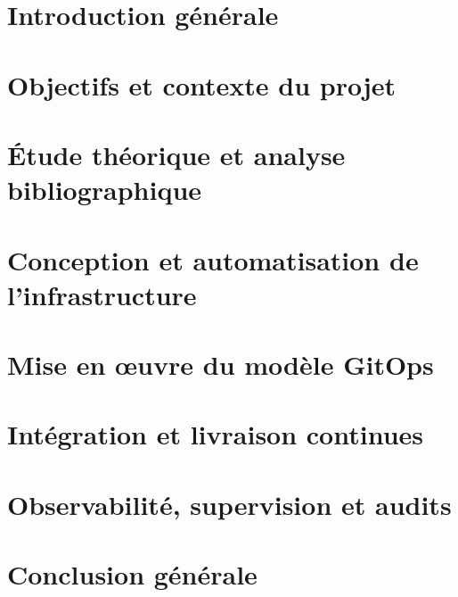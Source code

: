 \chapter{Introduction générale}


\chapter{Objectifs et contexte du projet}\label{chapter:objectifs_contexte}


\chapter{Étude théorique et analyse bibliographique}\label{chapter:etude_theorique}


\chapter{Conception et automatisation de l’infrastructure}\label{chapter:iac}


\chapter{Mise en œuvre du modèle GitOps}\label{chapter:gitops}


\chapter{Intégration et livraison continues}\label{chapter:cicd}


\chapter{Observabilité, supervision et audits}\label{chapter:observabilite_auditing}


\chapter{Conclusion générale}

